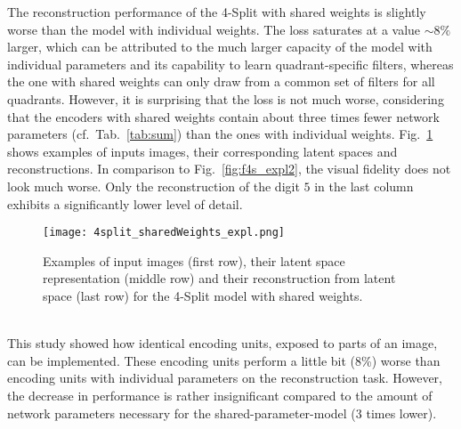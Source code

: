 \documentclass[../../main.tex]{subfiles}
\begin{document}
The reconstruction performance of the 4-Split with shared weights is slightly worse than the model with individual weights. The loss saturates at a value $\sim8\%$ larger, which can be attributed to the much larger capacity of the model with individual parameters and its capability to learn quadrant-specific filters, whereas the one with shared weights can only draw from a common set of filters for all quadrants. However, it is surprising that the loss is not much worse, considering that the encoders with shared weights contain about three times fewer network parameters (cf.~Tab.~\ref{tab:sum}) than the ones with individual weights. Fig.~\ref{fig:4s_shared} shows examples of inputs images, their corresponding latent spaces and reconstructions. In comparison to Fig.~\ref{fig:f4s_expl2}, the visual fidelity does not look much worse. Only the reconstruction of the digit $5$ in the last column exhibits a significantly lower level of detail.\\
\begin{figure}[htp]
			\begin{center}
				\texttt{[image: 4split\_sharedWeights\_expl.png]}
				\caption{Examples of input images (first row), their latent space representation (middle row) and their reconstruction from latent space (last row) for the 4-Split model with shared weights.}
				\label{fig:4s_shared}
			\end{center}
\end{figure}
\\
This study showed how identical encoding units, exposed to parts of an image, can be implemented. These encoding units perform a little bit (8\%) worse than encoding units with individual parameters on the reconstruction task. However, the decrease in performance  is rather insignificant compared to the amount of network parameters necessary for the shared-parameter-model (3 times lower).
\end{document}
